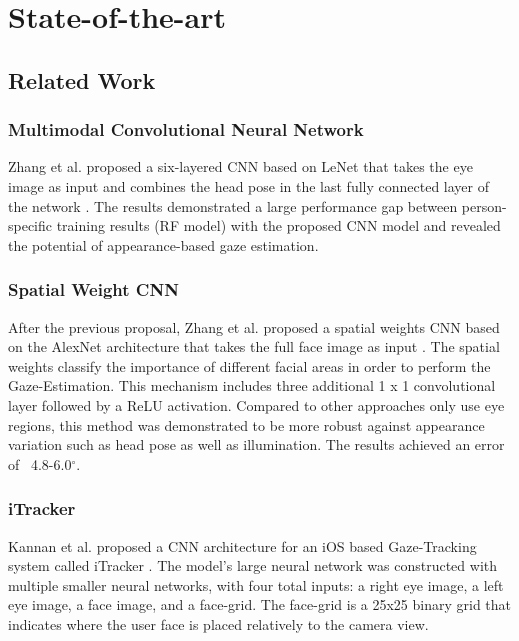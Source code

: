 
\chapter{State-of-the-art}
\label{Chap2}


\section{Related Work}

\subsection{Multimodal Convolutional Neural Network}
Zhang et al. proposed a six-layered CNN based on LeNet that takes the eye image as input and combines the head pose in the last fully connected layer of the network \cite{GazeEstimationInTheWild}. The results demonstrated a large performance gap between person-specific training results (RF model) with the proposed CNN model and revealed the potential of appearance-based gaze estimation.

\subsection{Spatial Weight CNN}
After the previous proposal, Zhang et al. proposed a spatial weights CNN based on the AlexNet architecture \cite{alex_net} that takes the full face image as input \cite{written_all_over_your_face}. The spatial weights classify the importance of different facial areas in order to perform the Gaze-Estimation. This mechanism includes three additional 1 x 1 convolutional layer followed by a ReLU activation. Compared to other approaches only use eye regions, this method was demonstrated to be more robust against appearance variation such as head pose as well as illumination. The results achieved an error of ~4.8-6.0$^{\circ}$.

\subsection{iTracker}
Kannan et al. proposed a CNN architecture for an iOS based Gaze-Tracking system called iTracker \cite{iTracker}. The model's large neural network was constructed with multiple smaller neural networks, with four total inputs: a right eye image, a left eye image, a face image, and a face-grid. The face-grid is a 25x25 binary grid that indicates where the user face is placed relatively to the camera view. 


